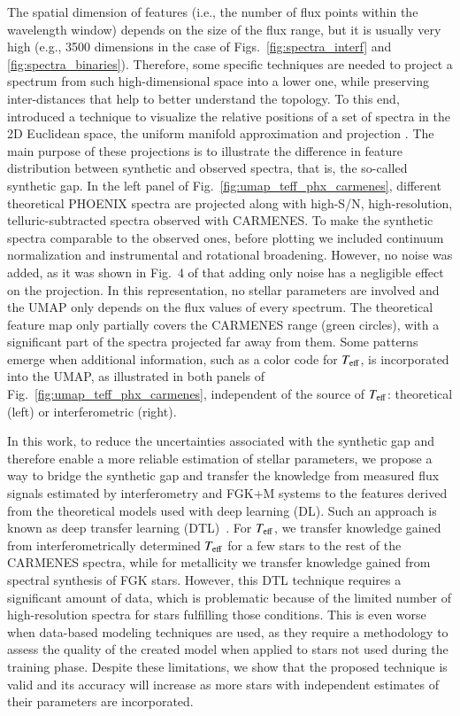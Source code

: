 \documentclass{aa}
\begin{document}
The spatial dimension of features (i.e., the number of flux points within the wavelength window) depends on the size of the flux range, but it is usually very high (e.g., 3500 dimensions in the case of Figs.~\ref{fig:spectra_interf} and \ref{fig:spectra_binaries}). Therefore, some specific techniques are needed to project a spectrum from such high-dimensional space into a lower one, while preserving inter-distances that help to better understand the topology. 
To this end,~\citet{Passegger2020} introduced a technique to visualize the relative positions of a set of spectra in the 2D Euclidean space, the uniform manifold approximation and projection \citep[UMAP; ][]{mcinnes2018umap-software}. 
The main purpose of these projections is to illustrate the difference in feature distribution between synthetic and observed spectra, that is, the so-called synthetic gap.
In the left panel of Fig.~\ref{fig:umap_teff_phx_carmenes}, different theoretical PHOENIX spectra are projected along with high-S/N, high-resolution, telluric-subtracted spectra observed with CARMENES. 
To make the synthetic spectra comparable to the observed ones, before plotting we included continuum normalization and instrumental and rotational broadening. 
However, no noise was added, as it was shown in Fig.~4 of \cite{Passegger2020} that adding only noise has a negligible effect on the projection.
In this representation, no stellar parameters are involved and the UMAP only depends on the flux values of every spectrum.
The theoretical feature map only partially covers the CARMENES range (green circles), with a significant part of the spectra projected far away from them. 
Some patterns emerge when additional information, such {as} a color code for $T_{\rm eff}$, is incorporated into the UMAP, as illustrated in both panels of Fig.~\ref{fig:umap_teff_phx_carmenes}, {independent of} the source of $T_{\rm eff}$: theoretical (left) or interferometric (right).


 In this work, to reduce the uncertainties associated {with} the synthetic gap and therefore enable {a more reliable estimation of stellar parameters}, we propose a way to bridge the synthetic gap and transfer the knowledge from measured flux signals estimated by interferometry and FGK+M systems to the features derived from the theoretical models used with deep learning (DL). 
Such an approach is known as deep transfer learning (DTL)~\citep{tan2018survey, awang2020classification, wei2020deep}. 
For $T_{\rm eff}$, we transfer knowledge gained from interferometrically determined $T_{\rm eff}$ for a few stars to the rest of the CARMENES spectra, while for metallicity we transfer knowledge gained from spectral synthesis of FGK stars.
However, this DTL technique requires a significant amount of data, which is problematic because of the limited number of high-resolution spectra for stars fulfilling those conditions. 
This is even worse when data-based modeling techniques are used, as they require a methodology to assess the quality of the created model when applied to stars not used during the training phase. 
Despite these limitations, we show that the proposed technique is valid and its accuracy will increase as more stars with independent estimates of their parameters are incorporated.
\end{document}
